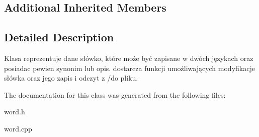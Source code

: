 \subsection*{Additional Inherited Members}


\subsection{Detailed Description}
Klasa reprezentuje dane słówko, które może być zapisane w dwóch językach oraz posiadac pewien synonim lub opis. dostarcza funkcji umożliwających modyfikacje słówka oraz jego zapis i odczyt z /do pliku. 

The documentation for this class was generated from the following files\+:\begin{DoxyCompactItemize}
\item 
word.\+h\item 
word.\+cpp\end{DoxyCompactItemize}
